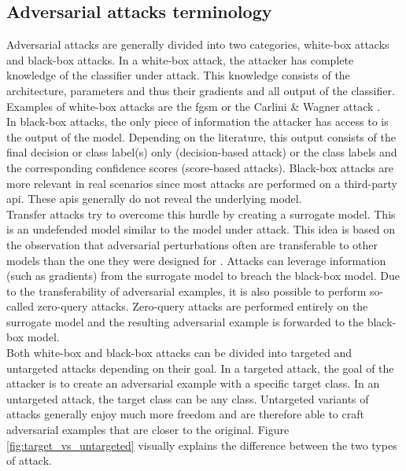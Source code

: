 \subsection{Adversarial attacks terminology}
Adversarial attacks are generally divided into two categories, white-box attacks and black-box attacks. In a white-box attack, the attacker has complete knowledge of the classifier under attack. This knowledge consists of the architecture, parameters and thus their gradients and all output of the classifier. Examples of white-box attacks are the \gls{fgsm} \cite{FGSM} or the Carlini \& Wagner attack \cite{cw_attack}.\\

In black-box attacks, the only piece of information the attacker has access to is the output of the model. Depending on the literature, this output consists of the final decision or class label(s) only (decision-based attack) or the class labels and the corresponding confidence scores (score-based attacks). Black-box attacks are more relevant in real scenarios since most attacks are performed on a third-party \gls{api}. These \glspl{api} generally do not reveal the underlying model.\\

Transfer attacks \cite{transfer_attack} try to overcome this hurdle by creating a surrogate model. This is an undefended model similar to the model under attack. This idea is based on the observation that adversarial perturbations often are transferable to other models than the one they were designed for \cite{FGSM}. Attacks can leverage information (such as gradients) from the surrogate model to breach the black-box model. Due to the transferability of adversarial examples, it is also possible to perform so-called zero-query attacks. Zero-query attacks are performed entirely on the surrogate model and the resulting adversarial example is forwarded to the black-box model.\\

Both white-box and black-box attacks can be divided into targeted and untargeted attacks depending on their goal. In a targeted attack, the goal of the attacker is to create an adversarial example with a specific target class. In an untargeted attack, the target class can be any class. Untargeted variants of attacks generally enjoy much more freedom and are therefore able to craft adversarial examples that are closer to the original. Figure \ref{fig:target_vs_untargeted} visually explains the difference between the two types of attack.

